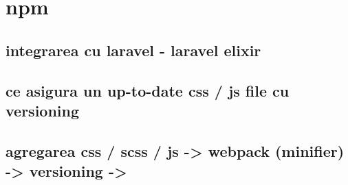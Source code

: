 \section{npm}
	\subsection{integrarea cu laravel - laravel elixir}
	\subsection{ce asigura un up-to-date css / js file cu versioning}
	\subsection{agregarea css / scss / js -> webpack (minifier) -> versioning ->}
